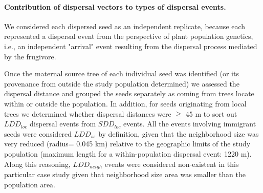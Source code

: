 \documentclass[a4paper, 12pt]{article}
\begin{document}
\begin{linenumbers}
\paragraph*{Contribution of dispersal vectors to types of dispersal events.} 
We considered each dispersed seed as an independent replicate, because each represented a dispersal event from the perspective of plant population genetics, i.e., an independent "arrival" event resulting from the dispersal process mediated by the frugivore. 

Once the maternal source tree of each individual seed was identified (or its provenance from outside the study population determined) we assessed the dispersal distance and grouped the seeds separately as coming from trees locate within or outside the population. In addition, for seeds originating from local trees we determined whether dispersal distances were $\geqq$ 45 m to sort out $LDD_{loc}$ dispersal events from $SDD_{loc}$ events. All the events involving immigrant seeds were considered $LDD_{ss}$ by definition, given that the neighborhood size was very reduced (radius= 0.045 km) relative to the geographic limits of the study population (maximum length for a within-population dispersal event: 1220 m)\citep{Garcia:2009do}. Along this reasoning, $LDD_{neigh}$ events were considered non-existent in this particular case study given that neighborhood size area was smaller than the population area.

\end{linenumbers}
\newpage
\end{document}
